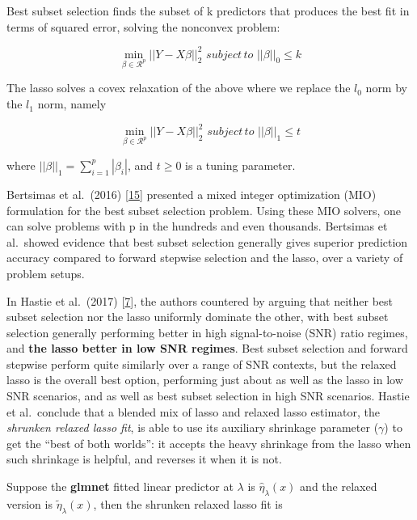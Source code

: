 \documentclass[
]{book}
\begin{document}
Best subset selection finds the subset of k predictors that
produces the best fit in terms of squared error, solving the nonconvex problem:

\begin{equation}
 \min_{\beta \in \mathcal{R}^p} ||Y - X\beta||^2_2 \, \, subject \, to \, \, ||\beta||_0 \leq k
 \label{eq:bestSub}
\end{equation}

The lasso solves a covex relaxation of the above where we replace the
\(l_0\) norm by the \(l_1\) norm, namely

\begin{equation}

 \min_{\beta \in \mathcal{R}^p} ||Y - X\beta||^2_2 \, \, subject \, to \, \, ||\beta||_1 \leq t

 \label{eq:lasso}
\end{equation}

where \(||\beta||_1 = \sum_{i=1}^{p} |\beta_i|\), and \(t \geq 0\) is a tuning parameter.

Bertsimas et al.~(2016) {[}\protect\hyperlink{ref-Bertsimas:2016aa}{15}{]} presented a mixed integer optimization (MIO)
formulation for the best subset selection problem. Using these MIO solvers,
one can solve problems with p in the hundreds and even thousands.
Bertsimas et al.~showed evidence that
best subset selection generally gives superior prediction accuracy compared
to forward stepwise selection and the lasso, over a variety of problem setups.

In Hastie et al.~(2017) {[}\protect\hyperlink{ref-Hastie:2017aa}{7}{]}, the authors countered by arguing that
neither best subset selection nor the lasso uniformly dominate the other,
with best subset selection generally performing better in high signal-to-noise (SNR)
ratio regimes, and \textbf{the lasso better in low SNR regimes}.
Best subset selection and forward stepwise perform quite similarly over
a range of SNR contexts, but the relaxed lasso is the overall best option,
performing just about as well as the lasso in low SNR scenarios,
and as well as best subset selection in high SNR scenarios.
Hastie et al.~conclude that a blended mix of lasso and relaxed lasso estimator,
the \emph{shrunken relaxed lasso fit}, is able to use its auxiliary shrinkage
parameter (\(\gamma\)) to get the ``best of both worlds'':
it accepts the heavy shrinkage from the lasso when such shrinkage is helpful, and reverses it when it is not.

Suppose the \textbf{glmnet} fitted linear predictor at \(\lambda\) is \(\hat{\eta}_\lambda(x)\)
and the relaxed version is \(\tilde{\eta}_\lambda(x)\), then the shrunken relaxed lasso fit is
\end{document}
